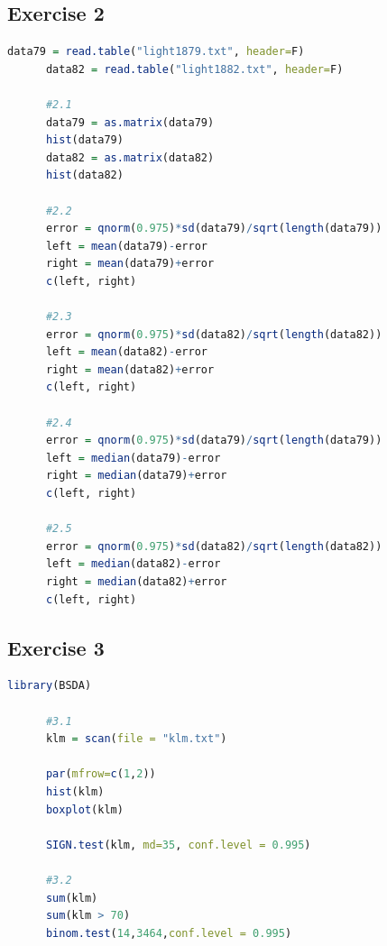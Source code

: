 \documentclass{article}
\begin{document}
    \subsection{Exercise 2}\label{sec:RE2}
      \begin{lstlisting}[language=R]
      data79 = read.table("light1879.txt", header=F)
      data82 = read.table("light1882.txt", header=F)

      #2.1
      data79 = as.matrix(data79)
      hist(data79)
      data82 = as.matrix(data82)
      hist(data82)

      #2.2
      error = qnorm(0.975)*sd(data79)/sqrt(length(data79))
      left = mean(data79)-error
      right = mean(data79)+error
      c(left, right)

      #2.3
      error = qnorm(0.975)*sd(data82)/sqrt(length(data82))
      left = mean(data82)-error
      right = mean(data82)+error
      c(left, right)

      #2.4
      error = qnorm(0.975)*sd(data79)/sqrt(length(data79))
      left = median(data79)-error
      right = median(data79)+error
      c(left, right)

      #2.5
      error = qnorm(0.975)*sd(data82)/sqrt(length(data82))
      left = median(data82)-error
      right = median(data82)+error
      c(left, right)
      \end{lstlisting}
    \subsection{Exercise 3}\label{sec:RE3}
      \begin{lstlisting}[language=R]
      library(BSDA)

      #3.1
      klm = scan(file = "klm.txt")

      par(mfrow=c(1,2))
      hist(klm)
      boxplot(klm)

      SIGN.test(klm, md=35, conf.level = 0.995)

      #3.2
      sum(klm)
      sum(klm > 70)
      binom.test(14,3464,conf.level = 0.995)

      \end{lstlisting}
\end{document}
